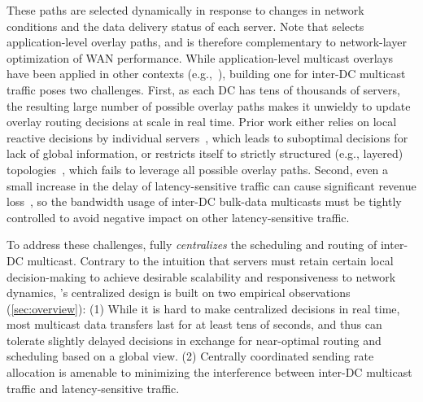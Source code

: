  These
paths are selected dynamically in response to changes in network
conditions and the data delivery status of each server. Note that
\name selects application-level overlay paths, and is therefore
complementary to network-layer optimization of WAN performance.
While application-level multicast overlays have been applied in other
contexts (e.g.,~\cite{Liebeherr2002Application,Wang2007mTreebone,
Andreev2013Designing,Mokhtarian2015Minimum}), building one for
inter-DC multicast traffic poses two challenges. First, as each DC
has tens of thousands of servers, the resulting large number of
possible overlay paths makes it unwieldy to update overlay routing
decisions at scale in real time. Prior work either relies on local
reactive decisions by individual servers~\cite{kostic2003bullet,
Repantis2010Scaling,Huang2014A}, which leads to suboptimal decisions
for lack of global information, or restricts itself to strictly
structured (e.g., layered) topologies~\cite{Nygren2010The}, which
fails to leverage all possible overlay paths. Second, even a small
increase in the delay of latency-sensitive traffic can cause
significant revenue loss~\cite{zhang2017communication}, so the bandwidth usage of inter-DC
bulk-data multicasts must be tightly controlled to avoid negative
impact on other latency-sensitive traffic.

To address these challenges, \name fully {\em centralizes} the
scheduling and routing of inter-DC multicast. Contrary to the
intuition that servers must retain certain local decision-making to
achieve desirable scalability and responsiveness to network dynamics,
\name's centralized design is built on two empirical observations
(\Section\ref{sec:overview}):
(1) While it is hard to make centralized decisions in real time, most
multicast data transfers last for at least tens of seconds, and thus
can tolerate slightly delayed decisions in exchange for near-optimal
routing and scheduling based on a global view.
(2) Centrally coordinated sending rate allocation is amenable to
minimizing the interference between inter-DC multicast traffic and
latency-sensitive traffic.

